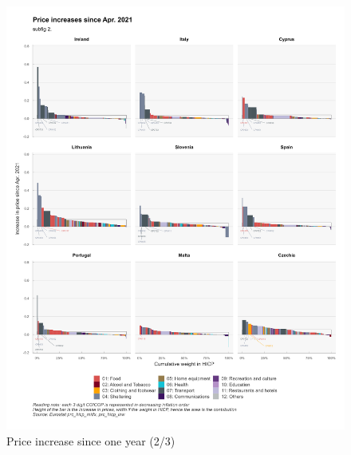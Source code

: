 \documentclass[
  9pt,
  a4paper,
  DIV=11,
  numbers=noendperiod,
  oneside]{scrartcl}
\begin{document}
\begin{figure}

\caption{Price increase since one year (2/3)}

{\centering \includegraphics[width=17cm,height=\textheight]{../svg/depuis_1y_2.png}

}

\end{figure}
\end{document}
